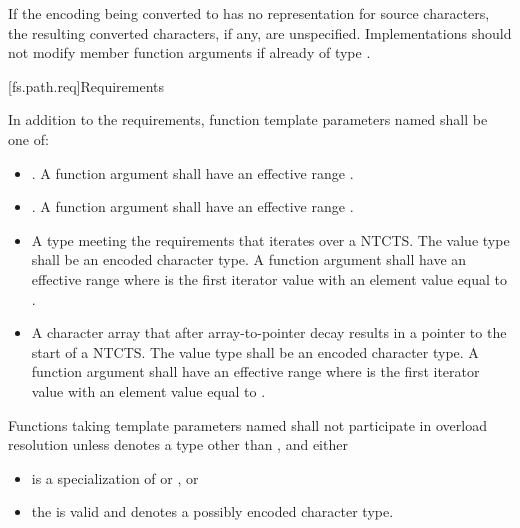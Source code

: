 \pnum
If the encoding being converted to has no representation for source
characters, the resulting converted characters, if any, are unspecified.
Implementations should not modify member function arguments
if already of type .

[fs.path.req]{Requirements}

\pnum
In addition to the requirements,
function template parameters named 
shall be one of:
\begin{itemize}
\item {}. A function
  argument   shall have an
  effective range .
\item {}. A function
  argument   shall have an
  effective range .
\item A type meeting the  requirements that iterates over a NTCTS\@.
  The value type shall be an encoded character type. A function argument
    shall have an effective range
   where  is the first
  iterator value with an element value equal to
  .
\item A character array that after array-to-pointer decay results in a
  pointer to the start of a NTCTS\@. The value type shall be an encoded character type. A
  function argument   shall
  have an effective range  where
   is the first iterator value with an element value equal to
  .
\end{itemize}

\pnum
Functions taking template parameters named 
shall not participate in overload resolution unless
 denotes a type other than , and
either
\begin{itemize}
\item
{} is a specialization of
 or , or
\item
the   is valid and
denotes a possibly  encoded character type.
\end{itemize}

